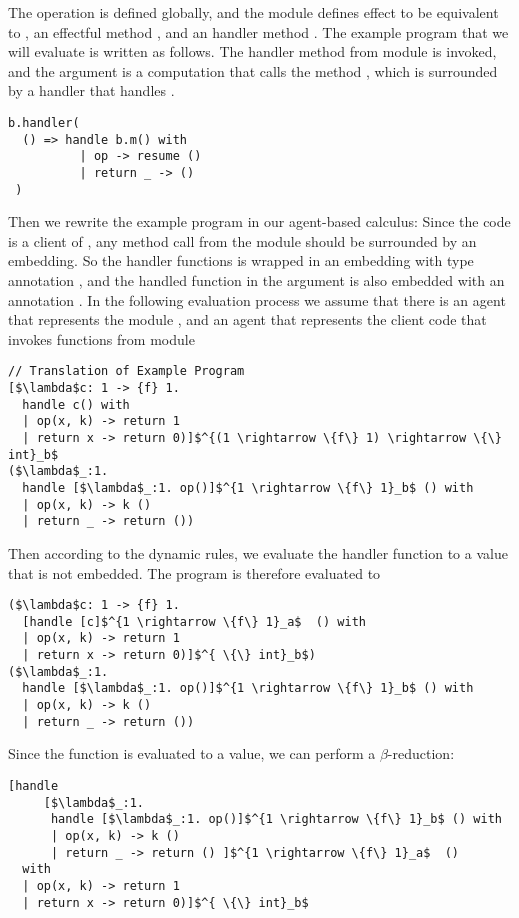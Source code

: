 The operation  is defined globally, and the module  defines effect  to be equivalent to ,  an effectful method , and an handler method . The example program that we will evaluate is written as follows. The handler method from module  is invoked, and the argument is a computation that calls the method , which is surrounded by a handler that handles . 
\begin{lstlisting}[mathescape = true]
b.handler(
  () => handle b.m() with
          | op -> resume ()
          | return _ -> ()
 )
 \end{lstlisting}
 Then we rewrite the example program in our agent-based calculus: Since the code is a client of , any method call from the module  should be surrounded by an embedding.  So the handler functions is wrapped in an embedding with type annotation , and the handled function in the argument is also embedded with an annotation . In the following evaluation process we assume that there is an agent  that represents the module , and an agent  that represents the client code that invokes functions from module 

\begin{lstlisting}[mathescape = true]
// Translation of Example Program
[$\lambda$c: 1 -> {f} 1. 
  handle c() with 
  | op(x, k) -> return 1
  | return x -> return 0)]$^{(1 \rightarrow \{f\} 1) \rightarrow \{\} int}_b$
($\lambda$_:1. 
  handle [$\lambda$_:1. op()]$^{1 \rightarrow \{f\} 1}_b$ () with
  | op(x, k) -> k ()
  | return _ -> return ())
 \end{lstlisting}
 
 Then according to the dynamic rules, we evaluate the handler function to a value that is not embedded. The program is therefore evaluated to 
 \begin{lstlisting}[mathescape = true]
 ($\lambda$c: 1 -> {f} 1. 
  [handle [c]$^{1 \rightarrow \{f\} 1}_a$  () with 
  | op(x, k) -> return 1
  | return x -> return 0)]$^{ \{\} int}_b$)
($\lambda$_:1. 
  handle [$\lambda$_:1. op()]$^{1 \rightarrow \{f\} 1}_b$ () with
  | op(x, k) -> k ()
  | return _ -> return ())
  \end{lstlisting}
 
Since the function is evaluated to a value, we can perform a $\beta$-reduction:
 \begin{lstlisting}[mathescape = true]
  [handle 
     [$\lambda$_:1. 
      handle [$\lambda$_:1. op()]$^{1 \rightarrow \{f\} 1}_b$ () with
      | op(x, k) -> k ()
      | return _ -> return () ]$^{1 \rightarrow \{f\} 1}_a$  () 
  with 
  | op(x, k) -> return 1
  | return x -> return 0)]$^{ \{\} int}_b$
 \end{lstlisting}
 
